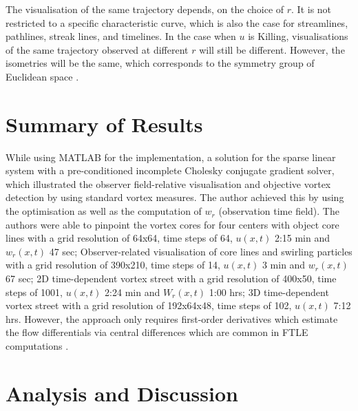 \documentclass[a4paper,9pt]{article}
\begin{document}
The visualisation of the same trajectory depends, on the choice of $r$. It is not restricted to a specific characteristic curve, which is also the case for streamlines, pathlines, streak lines, and timelines. In the case when $u$ is Killing, visualisations of the same trajectory observed at different $r$ will still be different. However, the isometries will be the same, which corresponds to the symmetry group of Euclidean space \cite{25}. 

\section{Summary of Results}

While using MATLAB for the implementation,  a solution for the sparse linear system with a pre-conditioned incomplete Cholesky conjugate gradient solver, which illustrated the observer field-relative visualisation and objective vortex detection by using standard vortex measures. The author achieved this by using the optimisation as well as the computation of $w_r$ (observation time field). The authors were able to pinpoint the vortex cores for four centers with object core lines with a grid resolution of 64x64, time steps of 64, $u(x,t)$ 2:15 min and $w_r(x,t)$ 47 sec; Observer-related visualisation of core lines and swirling particles with a grid resolution of 390x210, time steps of 14, $u(x,t)$ 3 min and $w_r(x,t)$ 67 sec; 2D time-dependent vortex street with a grid resolution of 400x50, time steps of 1001, $u(x,t)$ 2:24 min and $W_r(x,t)$ 1:00 hrs; 3D time-dependent vortex street with a grid resolution of 192x64x48, time steps of 102, $u(x,t)$ 7:12 hrs. However, the approach only requires first-order derivatives which estimate the flow differentials via central differences which are common in FTLE computations \cite{40}.


\section{Analysis and Discussion}
\end{document}
